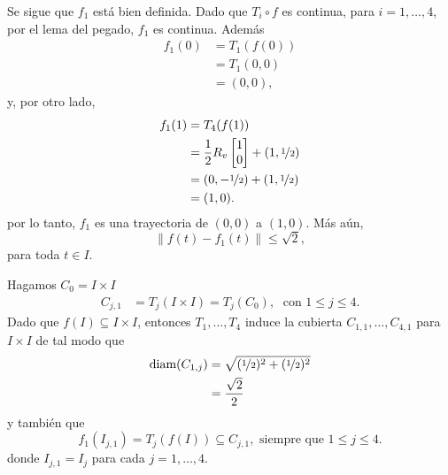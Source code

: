 Se sigue que $f_1$ está bien definida. Dado que $T_i\circ f$ es continua, para $i=1,\ldots, 4$, por el lema del pegado, $f_1$ es continua. Además
\begin{equation*}
    \begin{split}
        f_1(0)&=T_1(f(0))\\
        &=T_1(0,0)\\
        &=(0,0),
    \end{split}
\end{equation*}
y, por otro lado, 
\begin{equation*}
    \begin{split}
        f_1(1)&=T_4(f(1))\\
        &=\frac{1}{2}R_v\begin{bmatrix}
            1\\
            0
        \end{bmatrix}+(1,\nicefrac{1}{2})\\
        &=(0,-\nicefrac{1}{2})+(1,\nicefrac{1}{2})\\
        &=(1,0).
    \end{split}
\end{equation*}
por lo tanto, $f_1$ es una trayectoria de $(0,0)$ a $(1,0)$. Más aún, 
$$\|f(t)-f_1(t)\|\leq \sqrt{2},$$ 
para toda $t\in I$. 

Hagamos $C_0=I\times I$
\begin{align*}
    C_{j,1}&=T_j(I\times I)=T_j(C_0),\; \text{ con } 1\leq j\leq 4. 
\end{align*}
Dado que $f(I)\subseteq I\times I$, entonces $T_1,\ldots,T_4$ induce la cubierta $C_{1,1},\ldots, C_{4,1}$ para $I\times I$ de tal modo que 
\begin{align*}
    \text{diam}(C_{1,j})&=\sqrt{(\nicefrac{1}{2})^2+(\nicefrac{1}{2})^2}\\
    &=\frac{\sqrt{2}}{2}
\end{align*}
y también que 
\begin{equation}
    \label{eq:f_1(I)}
    f_1(I_{j,1})=T_j(f(I))\subseteq C_{j,1},\text{ siempre que } 1\leq j\leq 4.
\end{equation}
donde $I_{j,1}=I_j$ para cada $j=1,\ldots,4$.


